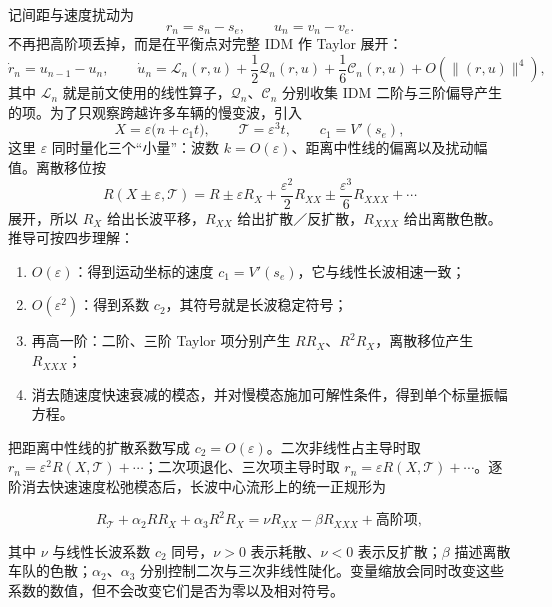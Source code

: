 \documentclass[11pt,a4paper,openany]{book}
\numberwithin{equation}{chapter}
\numberwithin{figure}{chapter}
\numberwithin{table}{chapter}
\begin{document}
记间距与速度扰动为
\begin{equation}
r_n=s_n-s_e,
\qquad
u_n=v_n-v_e .
\end{equation}
不再把高阶项丢掉，而是在平衡点对完整 IDM 作 Taylor 展开：
\begin{equation}
\dot r_n=u_{n-1}-u_n,
\qquad
\dot u_n=\mathcal L_n(r,u)+\frac12\mathcal Q_n(r,u)+\frac16\mathcal C_n(r,u)+O(\|(r,u)\|^4),
\label{eq:nonlinear-taylor}
\end{equation}
其中 $\mathcal L_n$ 就是前文使用的线性算子，$\mathcal Q_n$、$\mathcal C_n$ 分别收集 IDM 二阶与三阶偏导产生的项。为了只观察跨越许多车辆的慢变波，引入
\begin{equation}
X=\varepsilon\bigl(n+c_1t\bigr),
\qquad
\mathcal T=\varepsilon^3t,
\qquad
c_1=V'(s_e),
\label{eq:slow-scales}
\end{equation}
这里 $\varepsilon$ 同时量化三个“小量”：波数 $k=O(\varepsilon)$、距离中性线的偏离以及扰动幅值。离散移位按
\begin{equation}
R(X\pm\varepsilon,\mathcal T)
=R\pm\varepsilon R_X+\frac{\varepsilon^2}{2}R_{XX}
\pm\frac{\varepsilon^3}{6}R_{XXX}+\cdots
\label{eq:nonlinear-shift-expansion}
\end{equation}
展开，所以 $R_X$ 给出长波平移，$R_{XX}$ 给出扩散／反扩散，$R_{XXX}$ 给出离散色散。推导可按四步理解：
\begin{enumerate}[leftmargin=1.6em,itemsep=3pt]
\item $O(\varepsilon)$：得到运动坐标的速度 $c_1=V'(s_e)$，它与线性长波相速一致；
\item $O(\varepsilon^2)$：得到系数 $c_2$，其符号就是长波稳定符号；
\item 再高一阶：二阶、三阶 Taylor 项分别产生 $RR_X$、$R^2R_X$，离散移位产生 $R_{XXX}$；
\item 消去随速度快速衰减的模态，并对慢模态施加可解性条件，得到单个标量振幅方程。
\end{enumerate}

把距离中性线的扩散系数写成 $c_2=O(\varepsilon)$。二次非线性占主导时取 $r_n=\varepsilon^2R(X,\mathcal T)+\cdots$；二次项退化、三次项主导时取 $r_n=\varepsilon R(X,\mathcal T)+\cdots$。逐阶消去快速速度松弛模态后，长波中心流形上的统一正规形为
\begin{tcolorbox}[keybox,title=\textbf{原始 IDM 的弱非线性长波正规形}]
\begin{equation}
R_{\mathcal T}
+\alpha_2 R R_X
+\alpha_3 R^2R_X
=\nu R_{XX}-\beta R_{XXX}+\text{高阶项},
\label{eq:gardner-burgers}
\end{equation}
\end{tcolorbox}
其中 $\nu$ 与线性长波系数 $c_2$ 同号，$\nu>0$ 表示耗散、$\nu<0$ 表示反扩散；$\beta$ 描述离散车队的色散；$\alpha_2$、$\alpha_3$ 分别控制二次与三次非线性陡化。变量缩放会同时改变这些系数的数值，但不会改变它们是否为零以及相对符号。
\end{document}
